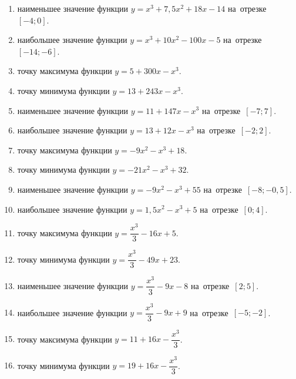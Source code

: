 \documentclass[a4paper,10pt]{article}
\begin{document}
\begin{enumerate}
\item {} наименьшее значение функции $y=x^3 +7,5x^2+18x-14$ на~отрезке~$\left[-4;0\right]$.

\item {} наибольшее значение функции $y=x^3 +10x^2-100x-5$ на~отрезке~$\left[-14;-6\right]$.

\item {} точку максимума функции $y=5+300x-x^3$.

\item {} точку минимума функции $y=13+243x-x^3$.

\item {} наименьшее значение функции $y=11+147x-x^3$ на~отрезке~$\left[-7;7\right]$.

\item {} наибольшее значение функции $y=13+12x-x^3$ на~отрезке~$\left[-2;2\right]$.

\item {} точку максимума функции $y=-9x^2-x^3+18$.

\item {} точку минимума функции $y=-21x^2-x^3+32$.

\item {} наименьшее значение функции $y=-9x^2-x^3+55$ на~отрезке~$\left[-8;-0,5\right]$.

\item {} наибольшее значение функции $y=1,5x^2-x^3+5$ на~отрезке~$\left[0;4\right]$.

\item {} точку максимума функции $y=\dfrac{x^3}{3} -16x+5$.

\item {} точку минимума функции $y=\dfrac{x^3}{3} -49x+23$.

\item {} наименьшее значение функции $y=\dfrac{x^3}{3} -9x-8$ на~отрезке~$\left[2;5\right]$.

\item {} наибольшее значение функции $y=\dfrac{x^3}{3} -9x+9$ на~отрезке~$\left[-5;-2\right]$.

\item {} точку максимума функции $y=11 +16x-\dfrac{x^3}{3}$.

\item {} точку минимума функции $y=19 +16x-\dfrac{x^3}{3}$.


\end{enumerate}
\end{document}
